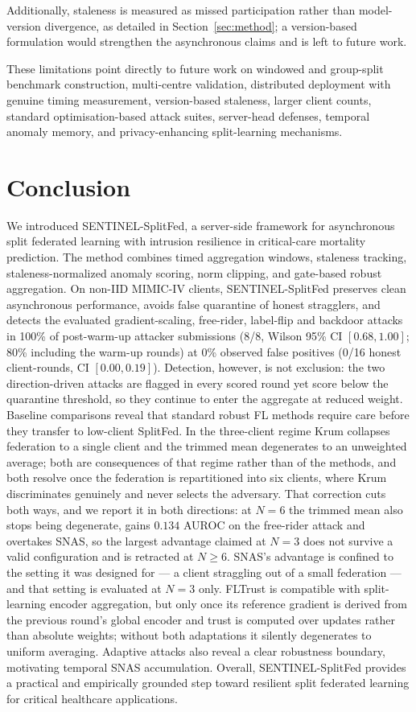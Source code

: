 \documentclass[pdflatex,sn-mathphys-num]{sn-jnl}
\begin{document}
Additionally, staleness is measured as missed participation rather than model-version divergence, as detailed in Section~\ref{sec:method}; a version-based formulation would strengthen the asynchronous claims and is left to future work.

These limitations point directly to future work on windowed and group-split benchmark construction, multi-centre validation, distributed deployment with genuine timing measurement, version-based staleness, larger client counts, standard optimisation-based attack suites, server-head defenses, temporal anomaly memory, and privacy-enhancing split-learning mechanisms.

\section{Conclusion}\label{sec:conclusion}

We introduced SENTINEL-SplitFed, a server-side framework for asynchronous split federated learning with intrusion resilience in critical-care mortality prediction. The method combines timed aggregation windows, staleness tracking, staleness-normalized anomaly scoring, norm clipping, and gate-based robust aggregation. On non-IID MIMIC-IV clients, SENTINEL-SplitFed preserves clean asynchronous performance, avoids false quarantine of honest stragglers, and detects the evaluated gradient-scaling, free-rider, label-flip and backdoor attacks in 100\% of post-warm-up attacker submissions (8/8, Wilson 95\% CI $[0.68,1.00]$; 80\% including the warm-up rounds) at 0\% observed false positives (0/16 honest client-rounds, CI $[0.00,0.19]$). Detection, however, is not exclusion: the two direction-driven attacks are flagged in every scored round yet score below the quarantine threshold, so they continue to enter the aggregate at reduced weight. Baseline comparisons reveal that standard robust FL methods require care before they transfer to low-client SplitFed. In the three-client regime Krum collapses federation to a single client and the trimmed mean degenerates to an unweighted average; both are consequences of that regime rather than of the methods, and both resolve once the federation is repartitioned into six clients, where Krum discriminates genuinely and never selects the adversary. That correction cuts both ways, and we report it in both directions: at $N=6$ the trimmed mean also stops being degenerate, gains $0.134$ AUROC on the free-rider attack and overtakes SNAS, so the largest advantage claimed at $N=3$ does not survive a valid configuration and is retracted at $N\geq6$. SNAS's advantage is confined to the setting it was designed for --- a client straggling out of a small federation --- and that setting is evaluated at $N=3$ only. FLTrust is compatible with split-learning encoder aggregation, but only once its reference gradient is derived from the previous round's global encoder and trust is computed over updates rather than absolute weights; without both adaptations it silently degenerates to uniform averaging. Adaptive attacks also reveal a clear robustness boundary, motivating temporal SNAS accumulation. Overall, SENTINEL-SplitFed provides a practical and empirically grounded step toward resilient split federated learning for critical healthcare applications.
\end{document}
